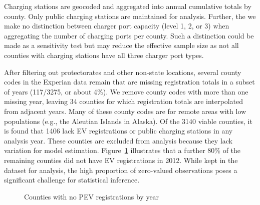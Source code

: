 \documentclass[
  letterpaper,
  DIV=11,
  numbers=noendperiod]{scrartcl}
\begin{document}
Charging stations are geocoded and aggregated into annual cumulative
totals by county. Only public charging stations are maintained for
analysis. Further, the we make no distinction between charger port
capacity (level 1, 2, or 3) when aggregating the number of charging
ports per county. Such a distinction could be made as a sensitivity test
but may reduce the effective sample size as not all counties with
charging stations have all three charger port types.

After filtering out protectorates and other non-state locations, several
county codes in the Experian data remain that are missing registration
totals in a subset of years (117/3275, or about 4\%). We remove county
codes with more than one missing year, leaving 34 counties for which
registration totals are interpolated from adjacent years. Many of these
county codes are for remote areas with low populations (e.g., the
Aleutian Islands in Alaska). Of the 3140 viable counties, it is found
that 1406 lack EV registrations or public charging stations in any
analysis year. These counties are excluded from analysis because they
lack variation for model estimation. Figure~\ref{fig-missing}
illustrates that a further 80\% of the remaining counties did not have
EV registrations in 2012. While kept in the dataset for analysis, the
high proportion of zero-valued observations poses a significant
challenge for statistical inference.

\begin{figure}

\begin{minipage}[t]{\linewidth}

{\centering 


\caption{\label{fig-missing}Counties with no PEV registrations by year}

}

\end{minipage}%

\end{figure}
\end{document}
